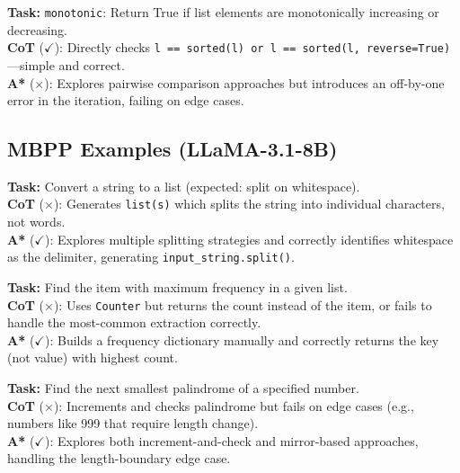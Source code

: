 \documentclass[11pt]{article}
\begin{document}
{{\begin{examplebox}[title=HumanEval/57 --- CoT Correct{,} A* Wrong]
\textbf{Task:} \texttt{monotonic}: Return True if list elements are monotonically increasing or decreasing.\\[4pt]
\textbf{CoT} ($\checkmark$): Directly checks \texttt{l == sorted(l) or l == sorted(l, reverse=True)}---simple and correct.\\[4pt]
\textbf{A*} ($\times$): Explores pairwise comparison approaches but introduces an off-by-one error in the iteration, failing on edge cases.
\end{examplebox}

\subsection{MBPP Examples (LLaMA-3.1-8B)}

\begin{examplebox}[title=MBPP/118 --- A* Correct{,} CoT Wrong]
\textbf{Task:} Convert a string to a list (expected: split on whitespace).\\[4pt]
\textbf{CoT} ($\times$): Generates \texttt{list(s)} which splits the string into individual characters, not words.\\[4pt]
\textbf{A*} ($\checkmark$): Explores multiple splitting strategies and correctly identifies whitespace as the delimiter, generating \texttt{input\_string.split()}.
\end{examplebox}

\begin{examplebox}[title=MBPP/130 --- A* Correct{,} CoT Wrong]
\textbf{Task:} Find the item with maximum frequency in a given list.\\[4pt]
\textbf{CoT} ($\times$): Uses \texttt{Counter} but returns the count instead of the item, or fails to handle the most-common extraction correctly.\\[4pt]
\textbf{A*} ($\checkmark$): Builds a frequency dictionary manually and correctly returns the key (not value) with highest count.
\end{examplebox}

\begin{examplebox}[title=MBPP/100 --- A* Correct{,} CoT Wrong]
\textbf{Task:} Find the next smallest palindrome of a specified number.\\[4pt]
\textbf{CoT} ($\times$): Increments and checks palindrome but fails on edge cases (e.g., numbers like 999 that require length change).\\[4pt]
\textbf{A*} ($\checkmark$): Explores both increment-and-check and mirror-based approaches, handling the length-boundary edge case.
\end{examplebox}

}}
\end{document}
